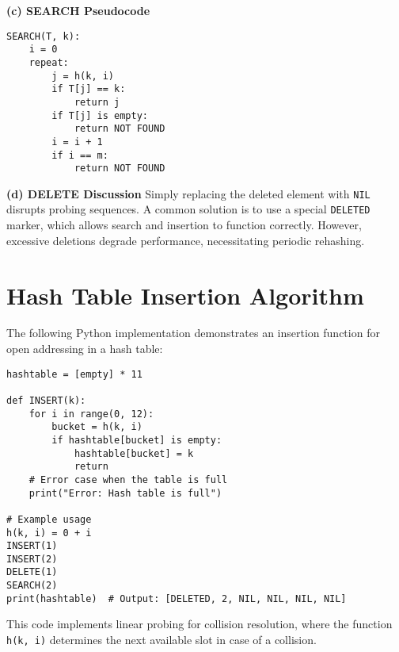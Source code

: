 \documentclass[12pt]{article}
\begin{document}
\textbf{(c) SEARCH Pseudocode}
\begin{lstlisting}
SEARCH(T, k):
    i = 0
    repeat:
        j = h(k, i)
        if T[j] == k:
            return j
        if T[j] is empty:
            return NOT FOUND
        i = i + 1
        if i == m:
            return NOT FOUND
\end{lstlisting}

\textbf{(d) DELETE Discussion}
Simply replacing the deleted element with \texttt{NIL} disrupts probing sequences. A common solution is to use a special \texttt{DELETED} marker, which allows search and insertion to function correctly. However, excessive deletions degrade performance, necessitating periodic rehashing.

\section*{Hash Table Insertion Algorithm}
The following Python implementation demonstrates an insertion function for open addressing in a hash table:

\begin{lstlisting}
hashtable = [empty] * 11

def INSERT(k):
    for i in range(0, 12):
        bucket = h(k, i)
        if hashtable[bucket] is empty:
            hashtable[bucket] = k
            return
    # Error case when the table is full
    print("Error: Hash table is full")

# Example usage
h(k, i) = 0 + i
INSERT(1)
INSERT(2)
DELETE(1)
SEARCH(2)
print(hashtable)  # Output: [DELETED, 2, NIL, NIL, NIL, NIL]
\end{lstlisting}

This code implements linear probing for collision resolution, where the function \texttt{h(k, i)} determines the next available slot in case of a collision.
\end{document}
